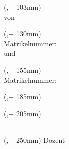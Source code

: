\begin{textblock*}{\seitenbreite}(\bindekorrektur,\seitenanfang + 103mm)
  \centering\large\sffamily
  \srhtyp
  \vspace{2mm} \\
  von
\end{textblock*}

\begin{textblock*}{\seitenbreite}(\bindekorrektur,\seitenanfang + 130mm)
  \centering\large
  \textbf{\srhautor} \\
  \vspace{2mm}
  Matrikelnummer: \srhmatnr \\
  \vspace{5mm}
  und
\end{textblock*}

\begin{textblock*}{\seitenbreite}(\bindekorrektur,\seitenanfang + 155mm)
  \centering\large
  \textbf{\srhautorzwei} \\
  \vspace{2mm}
  Matrikelnummer: \srhmatnrzwei
\end{textblock*}

\begin{textblock*}{\seitenbreite}(\bindekorrektur,\seitenanfang + 185mm)
  \centering\large
  \textsf{\srhdatum}
\end{textblock*}

\begin{textblock*}{\seitenbreite}(\bindekorrektur,\seitenanfang + 205mm)
  \centering\large\sffamily
  \srhkoerperschaft \\
  \vspace{2mm}
  \srhfakultaet \\
  \vspace{2mm}
  \srhstudiengang
\end{textblock*}

\begin{textblock*}{\seitenbreite}(\bindekorrektur,\seitenanfang + 250mm)
  \centering\large\sffamily
  Dozent \\
  \vspace{2mm}
  \srhfrank
\end{textblock*}

\null\newpage
\thispagestyle{empty}

\newcommand{\srhbib}{\begin{small}\textbf{\srhautorbib}: \\ \srhtitel \ / \srhautor. \ -- \\ \srhtyp, \srhort \: \srhkoerperschaft, \srhjahr. \pageref{lastpage} Seiten.\end{small}}
